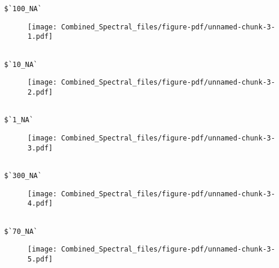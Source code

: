 \documentclass[
  letterpaper,
  DIV=11,
  numbers=noendperiod]{scrartcl}
\begin{document}
\begin{verbatim}
$`100_NA`
\end{verbatim}

\begin{figure}[H]

{\centering \texttt{[image: Combined\_Spectral\_files/figure-pdf/unnamed-chunk-3-1.pdf]}

}

\end{figure}

\begin{verbatim}

$`10_NA`
\end{verbatim}

\begin{figure}[H]

{\centering \texttt{[image: Combined\_Spectral\_files/figure-pdf/unnamed-chunk-3-2.pdf]}

}

\end{figure}

\begin{verbatim}

$`1_NA`
\end{verbatim}

\begin{figure}[H]

{\centering \texttt{[image: Combined\_Spectral\_files/figure-pdf/unnamed-chunk-3-3.pdf]}

}

\end{figure}

\begin{verbatim}

$`300_NA`
\end{verbatim}

\begin{figure}[H]

{\centering \texttt{[image: Combined\_Spectral\_files/figure-pdf/unnamed-chunk-3-4.pdf]}

}

\end{figure}

\begin{verbatim}

$`70_NA`
\end{verbatim}

\begin{figure}[H]

{\centering \texttt{[image: Combined\_Spectral\_files/figure-pdf/unnamed-chunk-3-5.pdf]}

}

\end{figure}
\end{document}
